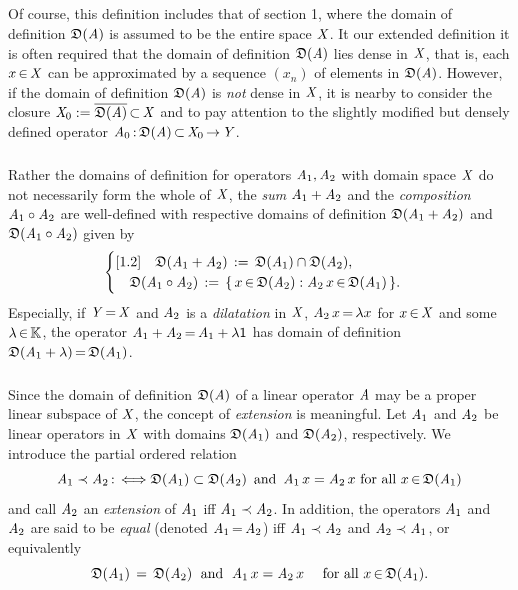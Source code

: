 \documentclass[11pt,twoside]{article}
\begin{document}
\subparagraph*{}
Of course,
this definition includes that of section 1,
where the domain of definition $\mathfrak{D}(\mathit{A})$ is assumed
to be the entire space $\mathit{X}$.
It our extended definition it is often required that 
the domain of definition $\mathfrak{D}(\mathit{A})$ lies dense in $\mathit{X}$,
that is,
each $x {\,\in\,} \mathit{X}$ can be approximated
by a sequence $(x_n)$ of elements in $\mathfrak{D}(\mathit{A})$.
However,
if the domain of definition $\mathfrak{D}(\mathit{A})$ is \textit{not} dense in $\mathit{X}$,
it is nearby to consider the closure
$\mathit{X}_0 := \overline{\mathfrak{D}(\mathit{A}) } {\,\subset\,} \mathit{X}$ 
and to pay attention to the slightly modified but densely defined operator
$\mathit{A}_0 {\,:\,} \mathfrak{D}(\mathit{A}) {\,\subset\,} \mathit{X}_0 {\,\to\,} \mathit{Y}$.

\subparagraph*{}
Rather the domains of definition for operators $\mathit{A}_1, \mathit{A}_2$
with domain space $\mathit{X}$ do not necessarily form the whole of $\mathit{X}$,
the \textit{sum} $\mathit{A}_1 + \mathit{A}_2$ and
the \textit{composition} $\mathit{A}_1 \circ \mathit{A}_2$ are well-defined
with respective domains of definition $\mathfrak{D}(\mathit{A}_1 + \mathit{A}_2)$
and $\mathfrak{D}(\mathit{A}_1 \circ \mathit{A}_2)$ given by
\[
\begin{cases}[1.2]
\quad 
\mathfrak{D}(\mathit{A}_1 + \mathit{A}_2) \,:=\, \mathfrak{D}(\mathit{A}_1) \cap \mathfrak{D}(\mathit{A}_2),\\
\quad
\mathfrak{D}(\mathit{A}_1 \circ \mathit{A}_2) \,:=\,
\{\, x {\,\in\,} \mathfrak{D}(\mathit{A}_2): \mathit{A}_2 \, x {\,\in\,} \mathfrak{D}(\mathit{A}_1)\,\}.\\
\end{cases}
\]
Especially,
if $\mathit{Y} {\,=\,} \mathit{X}$ and $\mathit{A}_2$ is a \textit{dilatation} in $\mathit{X}$,
{\ie}
$\mathit{A}_2 \, x {\,=\,} \lambda x$ for $x {\,\in\,} \mathit{X}$ and some $\lambda {\,\in\,} {\mathbb{K}}$,
the operator $\mathit{A}_1 + \mathit{A}_2 {\,=\,} \mathit{A}_1 + \lambda {\mathsf{1}}$ 
has domain of definition $\mathfrak{D}(\mathit{A}_1 + \lambda) {\,=\,} \mathfrak{D}(\mathit{A}_1)$.

\subparagraph*{}
Since the domain of definition $\mathfrak{D}(\mathit{A})$ of a linear operator $\mathit{A}$
may be a proper linear subspace of $\mathit{X}$,
the concept of \textit{extension} is meaningful.
Let $\mathit{A}_1$ and $\mathit{A}_2$ be linear operators in $\mathit{X}$
with domains $\mathfrak{D}(\mathit{A}_1)$ and $\mathfrak{D}(\mathit{A}_2)$,
respectively.
We introduce the partial ordered relation
\[
\mathit{A}_1 \prec \mathit{A}_2
{\,:\,} \Longleftrightarrow 
\mathfrak{D}(\mathit{A}_1) \subset \mathfrak{D}(\mathit{A}_2)
\, \mbox{ and } \,
\mathit{A}_1 \, x = \mathit{A}_2 \, x
\mbox{ for all } x {\,\in\,} \mathfrak{D}(\mathit{A}_1)
\]
and call $\mathit{A}_2$ an \textit{extension} of $\mathit{A}_1$
iff $\mathit{A}_1 \prec \mathit{A}_2$.
In addition,
the operators $\mathit{A}_1$ and $\mathit{A}_2$ are said to be \textit{equal}
(denoted $\mathit{A}_1 {\,=\,} \mathit{A}_2$)
iff $\mathit{A}_1 \prec \mathit{A}_2$ and $\mathit{A}_2 \prec \mathit{A}_1$,
or equivalently
\[
\mathfrak{D}(\mathit{A}_1) \,=\, \mathfrak{D}(\mathit{A}_2)
\; \mbox{ and } \;
\mathit{A}_1\,x = \mathit{A}_2\,x
\quad \mbox{ for all } x {\,\in\,} \mathfrak{D}(\mathit{A}_1).
\]
\end{document}
